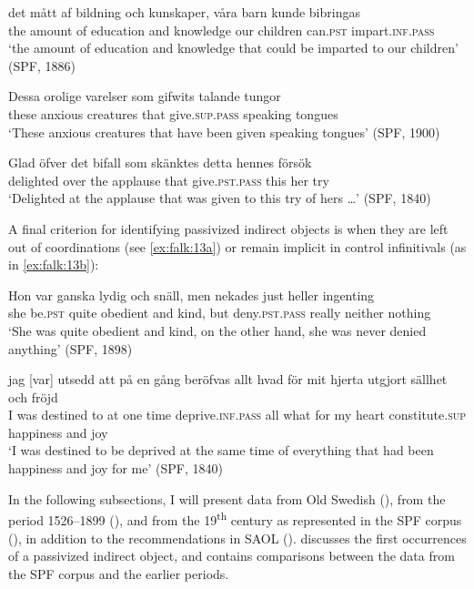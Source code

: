 \documentclass[output=paper]{langscibook}
\begin{document}
\ex \label{ex:falk:12b}
\gll det  mått      af  bildning    och  kunskaper,  våra  barn    kunde bibringas\\
      the  amount  of  education  and  knowledge  our  children  can.\textsc{pst}     impart.\textsc{inf}.\textsc{pass}\\
\glt ‘the amount of education and knowledge that could be imparted to our children’ (SPF, 1886)

\ex \label{ex:falk:12c}
\gll Dessa  orolige  varelser   som  gifwits      talande    tungor\\
      these    anxious  creatures that  give\textsc{.sup.pass}  speaking  tongues\\
\glt ‘These anxious creatures that have been given speaking tongues’ (SPF, 1900)

\ex \label{ex:falk:12d}
\gll Glad        öfver  det  bifall    som  skänktes      detta  hennes  försök\\
      delighted  over  the  applause    that  give\textsc{.pst}.\textsc{pass}  this  her    try\\
\glt ‘Delighted at the applause that was given to this try of hers …’ (SPF, 1840)
\z
\z


A final criterion for identifying passivized indirect objects is when they are left out of coordinations (see \ref{ex:falk:13a}) or remain implicit in control infinitivals (as in \ref{ex:falk:13b}):

\ea%
    \label{ex:falk:13}
\ea \label{ex:falk:13a}
\gll Hon  var      ganska  lydig      och  snäll,  men  nekades      just    heller ingenting\\
 she  be\textsc{.pst}  quite    obedient  and  kind,  but  deny.\textsc{pst.pass}  really    neither        nothing\\
\glt ‘She was quite obedient and kind, on the other hand, she was never denied anything’ (SPF, 1898)

\ex \label{ex:falk:13b}
\gll jag [var]   utsedd  att  på  en    gång  beröfvas            allt  hvad  för   mit  hjerta utgjort         sällhet    och  fröjd\\
I    was  destined  to  at  one  time  deprive\textsc{.inf.pass}  all    what  for   my  heart    constitute.\textsc{sup}    happiness  and  joy\\
\glt ‘I was destined to be deprived at the same time of everything that had been happiness and joy for me’ (SPF, 1840)
\z
\z


In the following subsections, I will present data from Old Swedish (), from the period 1526–1899 (), and from the 19\textsuperscript{th} century as represented in the SPF corpus (), in addition to the recommendations in SAOL ().  discusses the first occurrences of a passivized indirect object, and  contains comparisons between the data from the SPF corpus and the earlier periods.
\end{document}

